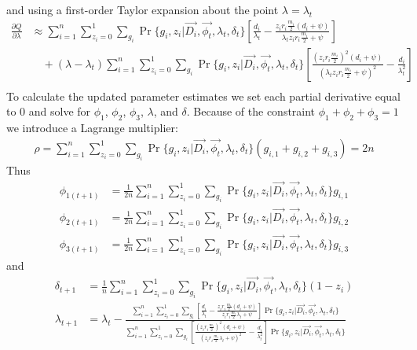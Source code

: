 \documentclass{article}
\begin{document}
and using a first-order Taylor expansion about the point $\lambda = \lambda_{t}$
\begin{align*}
\frac{\partial Q}{\partial \lambda} &\approx \sum_{i=1}^{n} \sum_{z_i = 0}^{1} \sum_{g_i} \Pr\{g_i, z_i | \vec{D_i}, \vec{\phi_{t}}, \lambda_{t}, \delta_{t}\} \left[\frac{d_i}{\lambda_{t}} - \frac{z_i r_i \frac{m_i}{2}(d_i + \psi)}{\lambda_{t} z_i r_i \frac{m_i}{2} + \psi} \right] \\
&\quad + (\lambda - \lambda_{t}) \sum_{i=1}^{n} \sum_{z_i = 0}^{1} \sum_{g_i} \Pr\{g_i, z_i | \vec{D_i}, \vec{\phi_{t}}, \lambda_{t}, \delta_{t}\} \left[\frac{(z_i r_i \frac{m_i}{2})^2(d_i + \psi)}{(\lambda_{t} z_i r_i \frac{m_i}{2} + \psi)^2} - \frac{d_i}{\lambda_{t}^2} \right] \\
\end{align*}
To calculate the updated parameter estimates we set each partial derivative equal to 0 and solve for $\phi_{1}$, $\phi_{2}$, $\phi_{3}$, $\lambda$, and $\delta$. Because of the constraint $\phi_1 + \phi_2 + \phi_3 = 1$ we introduce a Lagrange multiplier:
\begin{align*}
\rho = \sum_{i=1}^{n} \sum_{z_i = 0}^{1} \sum_{g_i} \Pr\{g_i, z_i | \vec{D_i}, \vec{\phi_{t}}, \lambda_{t}, \delta_{t}\}(g_{i,1} + g_{i,2} + g_{i,3}) = 2n
\end{align*}
Thus
\begin{align*}
\phi_{1 (t + 1)} &= \frac{1}{2n} \sum_{i=1}^{n} \sum_{z_i = 0}^{1} \sum_{g_i} \Pr\{g_i, z_i | \vec{D_i}, \vec{\phi_{t}}, \lambda_{t}, \delta_{t}\} g_{i,1} \\
\phi_{2 (t + 1)} &= \frac{1}{2n} \sum_{i=1}^{n} \sum_{z_i = 0}^{1} \sum_{g_i} \Pr\{g_i, z_i | \vec{D_i}, \vec{\phi_{t}}, \lambda_{t}, \delta_{t}\} g_{i,2} \\
\phi_{3 (t + 1)} &= \frac{1}{2n} \sum_{i=1}^{n} \sum_{z_i = 0}^{1} \sum_{g_i} \Pr\{g_i, z_i | \vec{D_i}, \vec{\phi_{t}}, \lambda_{t}, \delta_{t}\} g_{i,3}
\end{align*}
and
\begin{align*}
\delta_{t + 1} &= \frac{1}{n} \sum_{i=1}^{n} \sum_{z_i = 0}^{1} \sum_{g_i} \Pr\{g_i, z_i | \vec{D_i}, \vec{\phi_{t}}, \lambda_{t}, \delta_{t}\}(1 - z_i) \\
\lambda_{t + 1} &= \lambda_{t} - \frac{\displaystyle{\sum_{i=1}^{n} \sum_{z_i = 0}^{1} \sum_{g_i} \left[ \frac{d_i}{\lambda_{t}} - \frac{z_i r_i \frac{m_i}{2} (d_i + \psi)}{z_i r_i \frac{m_i}{2} \lambda_{t} + \psi} \right]} \Pr\{g_i, z_i | \vec{D_i}, \vec{\phi_{t}}, \lambda_{t}, \delta_{t}\}}{\displaystyle{\sum_{i=1}^{n} \sum_{z_i = 0}^{1} \sum_{g_i} \left[ \frac{(z_i r_i \frac{m_i}{2})^2 (d_i + \psi)}{(z_i r_i \frac{m_i}{2} \lambda_{t} + \psi)^2} - \frac{d_i}{\lambda_{t}^2} \right]} \Pr\{g_i, z_i | \vec{D_i}, \vec{\phi_{t}}, \lambda_{t}, \delta_{t}\}}
\end{align*}
\end{document}

